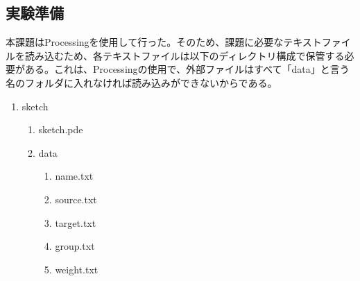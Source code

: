 \documentclass[dvipdfmx]{jsarticle}
\begin{document}
\subsection{実験準備}
本課題はProcessingを使用して行った。そのため、課題に必要なテキストファイルを読み込むため、各テキストファイルは以下のディレクトリ構成で保管する必要がある。これは、Processingの使用で、外部ファイルはすべて「data」と言う名のフォルダに入れなければ読み込みができないからである。
\begin{enumerate}
  \item sketch
  \begin{enumerate}
    \item sketch.pde
    \item data
    \begin{enumerate}
      \item name.txt
      \item source.txt
      \item target.txt
      \item group.txt
      \item weight.txt
    \end{enumerate}
  \end{enumerate}
\end{enumerate}
\end{document}
